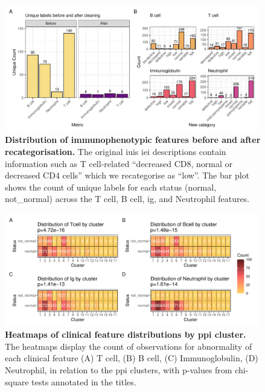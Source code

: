 \begin{figure}[ht]
  \centering
  \includegraphics[width=0.99\textwidth]{../images/plot_patch1.pdf}
  \caption{ \textbf{Distribution of immunophenotypic features before and after recategorisation.}
  The original \ac{iuis} \ac{iei} descriptions contain information such as T cell-related
  ``decreased CD8, normal or decreased CD4 cells'' which we recategorise as ``low''.
  The bar plot shows the count of unique labels for each status (normal, not\_normal) across the T cell, B cell, \ac{ig}, and Neutrophil features.}
  \label{fig:immunophenotype_before_after}
\end{figure}


\begin{figure}[ht]
  \centering
  \includegraphics[width=0.99\textwidth]{../images/plot_multicat_patch_3_clust_chi.pdf}
  \caption{\textbf{Heatmaps of clinical feature distributions by \ac{ppi} cluster.} The heatmaps display the count of observations for abnormality of each clinical feature (A) T cell, (B) B cell, (C) Immunoglobulin, (D) Neutrophil, in relation to the \ac{ppi} clusters, with p-values from chi-square tests annotated in the titles.}
  \label{fig:plot_multicat_patch_3_clust_chi}
\end{figure}

